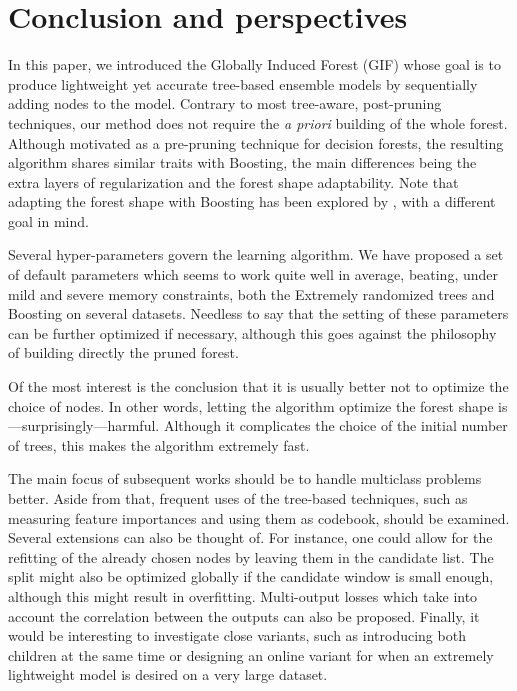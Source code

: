 \documentclass{article}
\begin{document}

\section{Conclusion and perspectives}
\label{sec:conclusion}

In this paper, we introduced the Globally Induced Forest (GIF) whose goal is to
produce lightweight yet accurate tree-based ensemble models by sequentially
adding nodes to the model. Contrary to most tree-aware, post-pruning techniques,
our method does not require the {\it a priori} building of the whole
forest. Although motivated as a pre-pruning technique for decision forests, the
resulting algorithm shares similar traits with Boosting, the main differences
being the extra layers of regularization and the forest shape adaptability. Note
that adapting the forest shape with Boosting has been explored by
\citet{johnson2014regforest}, with a different goal in mind.

Several hyper-parameters govern the learning algorithm. We have proposed a set
of default parameters which seems to work quite well in average, beating, under
mild and severe memory constraints, both the Extremely randomized trees and
Boosting on several datasets. Needless to say that the setting of these
parameters can be further optimized if necessary, although this goes against the
philosophy of building directly the pruned forest.

Of the most interest is the conclusion that it is usually better not to optimize
the choice of nodes. In other words, letting the algorithm optimize the forest
shape is---surprisingly---harmful. Although it complicates the choice of the
initial number of trees, this makes the algorithm extremely fast.

The main focus of subsequent works should be to handle multiclass problems
better. Aside from that, frequent uses of the tree-based techniques, such as
measuring feature importances and using them as codebook, should be examined.
Several extensions can also be thought of. For instance, one could allow for the
refitting of the already chosen nodes by leaving them in the candidate list. The
split might also be optimized globally if the candidate window is small enough,
although this might result in overfitting. Multi-output losses which take into
account the correlation between the outputs can also be proposed.  Finally, it 
would be interesting to investigate close variants, such as introducing both 
children at the same time or designing an online variant for when an
extremely lightweight model is desired on a very large dataset.
\end{document}
